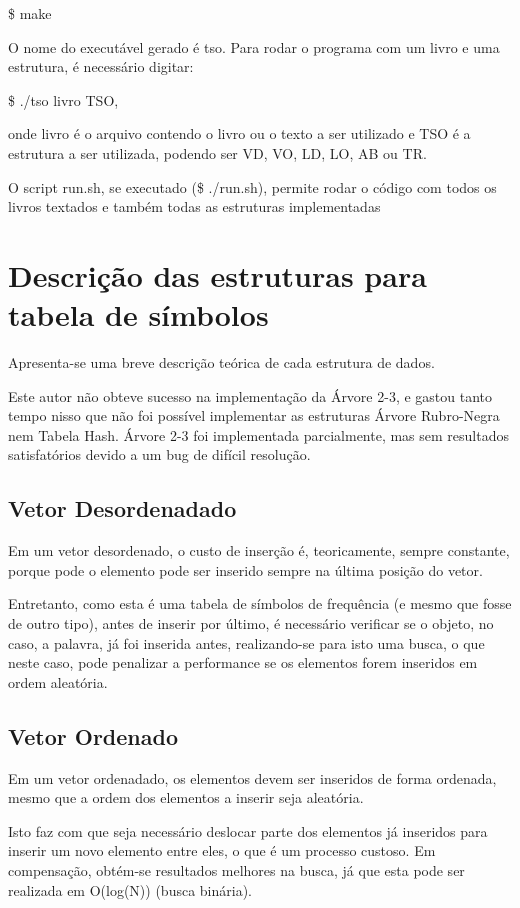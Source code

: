 \documentclass[a4paper]{article}
\begin{document}
\$ make

O nome do executável gerado é tso.
Para rodar o programa com um livro e uma estrutura, é necessário digitar:

\$ ./tso livro TSO,

onde livro é o arquivo contendo o livro ou o texto a ser utilizado e TSO é a estrutura a ser utilizada, podendo ser VD, VO, LD, LO, AB ou TR.

O script run.sh, se executado (\$ ./run.sh), permite rodar o código com todos os livros textados e também todas as estruturas implementadas

\section{Descrição das estruturas  para tabela de símbolos}
Apresenta-se uma breve descrição teórica de cada estrutura de dados.

Este autor não obteve sucesso na implementação da Árvore 2-3, e gastou tanto tempo nisso que não foi possível implementar as estruturas Árvore Rubro-Negra nem Tabela Hash.
Árvore 2-3 foi implementada parcialmente, mas sem resultados satisfatórios devido a um bug de difícil resolução.

\subsection{Vetor Desordenadado}
Em um vetor desordenado, o custo de inserção é, teoricamente, sempre constante, porque pode o elemento pode ser inserido sempre na última posição do vetor.

Entretanto, como esta é uma tabela de símbolos de frequência (e mesmo que fosse de outro tipo), antes de inserir por último, é necessário verificar se o objeto, no caso, a palavra, já foi inserida antes, realizando-se para isto uma busca, o que neste caso, pode penalizar a performance se os elementos forem inseridos em ordem aleatória.

\subsection{Vetor Ordenado}

Em um vetor ordenadado, os elementos devem ser inseridos de forma ordenada, mesmo que a ordem dos elementos a inserir seja aleatória.

Isto faz com que seja necessário deslocar parte dos elementos já inseridos para inserir um novo elemento entre eles, o que é um processo custoso.
Em compensação, obtém-se resultados melhores na busca, já que esta pode ser realizada em O(log(N)) (busca binária).
\end{document}
